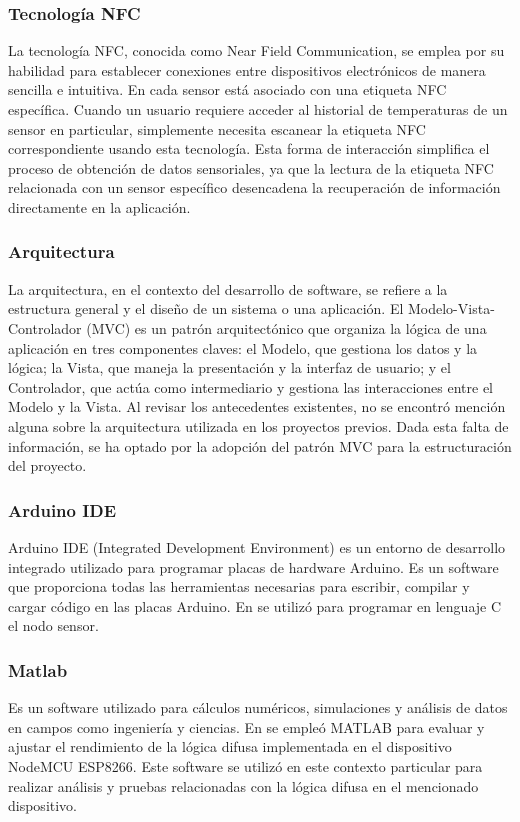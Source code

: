 \subsubsection*{Tecnología NFC}
La tecnología NFC, conocida como Near Field Communication, se emplea por su habilidad para establecer conexiones entre dispositivos electrónicos de manera sencilla e intuitiva. En \cite{haiyan_intelligent_2022} cada sensor está asociado con una etiqueta NFC específica. Cuando un usuario requiere acceder al historial de temperaturas de un sensor en particular, simplemente necesita escanear la etiqueta NFC correspondiente usando esta tecnología. Esta forma de interacción simplifica el proceso de obtención de datos sensoriales, ya que la lectura de la etiqueta NFC relacionada con un sensor específico desencadena la recuperación de información directamente en la aplicación.

\subsubsection*{Arquitectura}
La arquitectura, en el contexto del desarrollo de software, se refiere a la estructura general y el diseño de un sistema o una aplicación. El Modelo-Vista-Controlador (MVC) es un patrón arquitectónico que organiza la lógica de una aplicación en tres componentes claves: el Modelo, que gestiona los datos y la lógica; la Vista, que maneja la presentación y la interfaz de usuario; y el Controlador, que actúa como intermediario y gestiona las interacciones entre el Modelo y la Vista. Al revisar los antecedentes existentes, no se encontró mención alguna sobre la arquitectura utilizada en los proyectos previos. Dada esta falta de información, se ha optado por la adopción del patrón MVC para la estructuración del proyecto.

\subsubsection*{Arduino IDE}
Arduino IDE (Integrated Development Environment) es un entorno de desarrollo integrado utilizado para programar placas de hardware Arduino. Es un software que proporciona todas las herramientas necesarias para escribir, compilar y cargar código en las placas Arduino. En \cite{widyawati_fuzzy_2022} se utilizó para programar en lenguaje C el nodo sensor.

\subsubsection*{Matlab}
Es un software utilizado para cálculos numéricos, simulaciones y análisis de datos en campos como ingeniería y ciencias. En \cite{widyawati_fuzzy_2022} se empleó MATLAB para evaluar y ajustar el rendimiento de la lógica difusa implementada en el dispositivo NodeMCU ESP8266. Este software se utilizó en este contexto particular para realizar análisis y pruebas relacionadas con la lógica difusa en el mencionado dispositivo.

